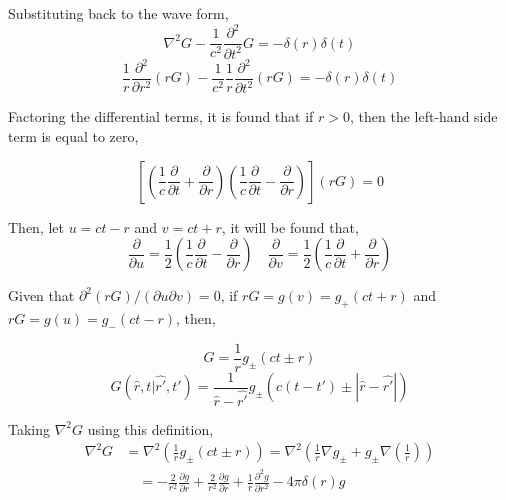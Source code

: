 Substituting back to the wave form,
\begin{equation*}
    \nabla^2G - \frac{1}{c^2}\frac{\partial^2}{\partial t^2}G=-\delta(r)\delta(t)
\end{equation*}
\begin{equation*}
    \frac{1}{r}\frac{\partial^2}{\partial r^2}(rG) - \frac{1}{c^2}\frac{1}{r}\frac{\partial^2}{\partial t^2} (rG)=-\delta(r)\delta(t)
\end{equation*}

Factoring the differential terms, it is found that if $r>0$, then the left-hand side term is equal to zero,

\begin{equation}
    \left[\left(\frac{1}{c}\frac{\partial}{\partial t} + \frac{\partial}{\partial r} \right)\left(\frac{1}{c}\frac{\partial}{\partial t} - \frac{\partial}{\partial r} \right) \right](rG)=0
    \label{eq:green_step1}
\end{equation}

Then, let $u=ct-r$ and $v=ct+r$, it will be found that,
\begin{equation*}
    \frac{\partial}{\partial u} = \frac{1}{2} \left(\frac{1}{c}\frac{\partial}{\partial t} -\frac{\partial}{\partial r}\right)
    \quad
    \frac{\partial}{\partial v} = \frac{1}{2} \left(\frac{1}{c}\frac{\partial}{\partial t} +\frac{\partial}{\partial r}\right)
\end{equation*}

Given that $\partial^2(rG)/(\partial u\partial v)=0$, if $rG=g(v)=g_+(ct+r)$ and $rG=g(u)=g_-(ct-r)$, then,

\begin{equation*}
    G=\frac{1}{r}g_{\pm}(ct\pm r)
\end{equation*}
\begin{equation*}
    G(\hat{r},t | \hat{r'},t')=\frac{1}{\hat{r}-\hat{r'}}g_{\pm}(c(t-t') \pm |\hat{r} - \hat{r'}|)
\end{equation*}

Taking $\nabla^2G$ using this definition,
\begin{equation*}
    \begin{split}
        \nabla^2G&=\nabla^2 \left(\frac{1}{r}g_{\pm}(ct\pm r) \right) =\nabla^2 \left(\frac{1}{r}\nabla g_{\pm} + g_{\pm} \nabla \left(\frac{1}{r} \right) \right) \\
        &\quad = - \frac{2}{r^2}\frac{\partial g}{\partial r} + \frac{2}{r^2}\frac{\partial g}{\partial r} + \frac{1}{r}\frac{\partial^2g}{\partial r^2} - 4\pi \delta(r)g
    \end{split}
\end{equation*}

